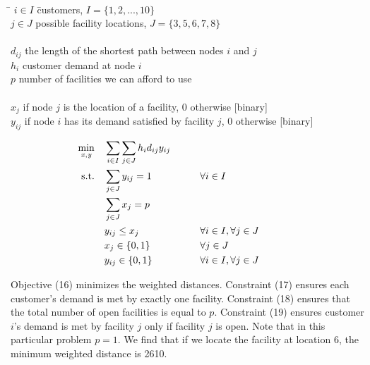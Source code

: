 \documentclass[10pt]{article}
\begin{document}
\begin{enumerate}
\begin{tabbing}
\\[0.2cm]
\hspace*{.5cm} \= $i\in I$ \hspace{2.8cm} \= customers, $I=\{1,2,...,10\}$ \\
\> $j\in J$ \> possible facility locations, $J=\{3,5,6,7,8\}$\\[0.2cm]
\\[0.2cm] 
\> $d_{ij}$ \> the length of the shortest path between nodes $i$ and $j$ \\
\> $h_i$ \> customer demand at node $i$ \\
\> $p$  \> number of facilities we can afford to use\\[0.2cm]
\\
\> $x_j$  if node $j$ is the location of a facility, 0 otherwise  [binary] \\
\> $y_{ij}$  if node $i$ has its demand satisfied by facility $j$, 0 otherwise  [binary] \\[0.2cm] 
\end{tabbing}
\begin{alignat}{3}
\min_{ \tiny{\it x, y}} \quad & \sum_{i \in I} \sum_{j \in J} h_i d_{ij} y_{ij} \\
\mbox{s.t.} \quad & \sum_{j\in J} y_{ij} = 1 &\qquad&  \forall i \in I &\qquad& \\
& \sum_{j \in J} x_j = p &&  \\
& y_{ij} \le x_j &\qquad& \forall i \in I, \forall j \in J\\
& x_j \in \{0,1\} && \forall j\in J \\
 & y_{ij} \in \{0,1\} && \forall i\in I, \forall j \in J
\end{alignat}


Objective (16) minimizes the weighted distances.  Constraint (17) ensures each customer's demand is met by exactly one facility.  Constraint (18) ensures that the total number of open facilities is equal to $p$.  Constraint (19) ensures customer $i$'s demand is met by facility $j$ only if facility $j$ is open.  Note that in this particular problem $p=1$.  We find that if we locate the facility at location 6, the minimum weighted distance is 2610.

\end{enumerate}

  
\end{document}
